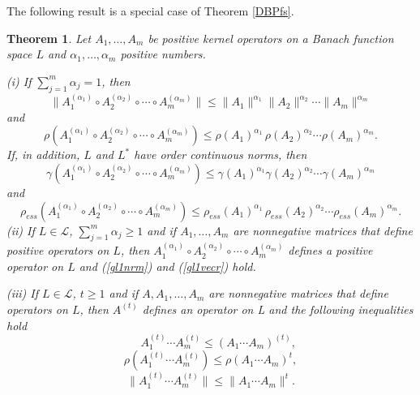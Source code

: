 \documentclass[12pt, reqno]{amsart}
\newtheorem{theorem}{Theorem}[section]
\theoremstyle{definition}
\theoremstyle{remark}
\numberwithin{equation}{section}
\newcommand{\be}{\begin{equation}}
\newcommand{\ee}{\end{equation}}
\begin{document}
The following result is a special case  of Theorem \ref{DBPfs}.
\begin{theorem}
\label{special_case}
Let $A_1 ,\ldots, A_m$ be positive kernel operators on a Banach function space  $L$
and $\alpha _1, \ldots, \alpha _m$ positive numbers. %

\noindent (i) If $\sum_{j=1}^m \alpha _j = 1$, then 
\be
 \|A_1 ^{( \alpha _1)} \circ A_2 ^{(\alpha _2)} \circ \cdots \circ A_m ^{(\alpha _m)} \| \le
  \|A_1\|^{ \alpha _1}  \|A_2\|^{\alpha _2} \cdots \|A_m\|^{\alpha _m}
\label{gl1nrm}
\ee
and
\be
 \rho(A_1 ^{( \alpha _1)} \circ A_2 ^{(\alpha _2)} \circ \cdots \circ A_m ^{(\alpha _m)} ) \le
\rho(A_1)^{ \alpha _1} \, \rho(A_2)^{\alpha _2} \cdots \rho(A_m)^{\alpha _m} .
\label{gl1vecr}
\ee
If, in addition, $L$ and $L^*$ have order continuous norms, then
\be
 \gamma (A_1 ^{( \alpha _1)} \circ A_2 ^{(\alpha _2)} \circ \cdots \circ A_m ^{(\alpha _m)} )\le
  \gamma(A_1)^{ \alpha _1}  \gamma(A_2)^{\alpha _2} \cdots \gamma(A_m)^{\alpha _m}
\label{gl1meas_nonc}
\ee
and
\be
 \rho _{ess}(A_1 ^{( \alpha _1)} \circ A_2 ^{(\alpha _2)} \circ \cdots \circ A_m ^{(\alpha _m)} ) \le
\rho _{ess }(A_1)^{ \alpha _1} \, \rho _{ess}(A_2)^{\alpha _2} \cdots \rho _{ess}(A_m)^{\alpha _m} .
\label{gl1vecress}
\ee
\noindent(ii) If $L\in\mathcal L$, $\sum_{j=1}^{m} \alpha _j\ge 1$ and if  $A_1 ,\ldots, A_m$ are nonnegative matrices that define positive operators on $L$, then $A_1 ^{( \alpha _1)} \circ A_2 ^{(\alpha _2)} \circ \cdots \circ A_m ^{(\alpha _m)}$ defines a positive operator on $L$ and (\ref{gl1nrm}) and (\ref{gl1vecr}) hold.

\noindent (iii)  If $L\in\mathcal L$, $t\ge1$ and if $A, A_1 ,\ldots, A_m$ are nonnegative matrices that define operators on $L$,    then $A^{(t)}$ %
 defines an  operator on L and the following inequalities hold
\be
\;\;\;\;\;A_1^{(t)}\cdots A_m^{(t)}\le(A_1\cdots A_m)^{(t)},
\label{gl1t}
\ee
\be
\rho(A_1^{(t)}\cdots A_m^{(t)})\le\rho(A_1\cdots A_m)^{t},
\label{gl1nt}
\ee
\be
\|A_1^{(t)}\cdots A_m^{(t)}\|\le\|A_1\cdots A_m\|^{t}.
\label{gl1vecrt}
\ee






\end{theorem}

\bigskip
\end{document}
